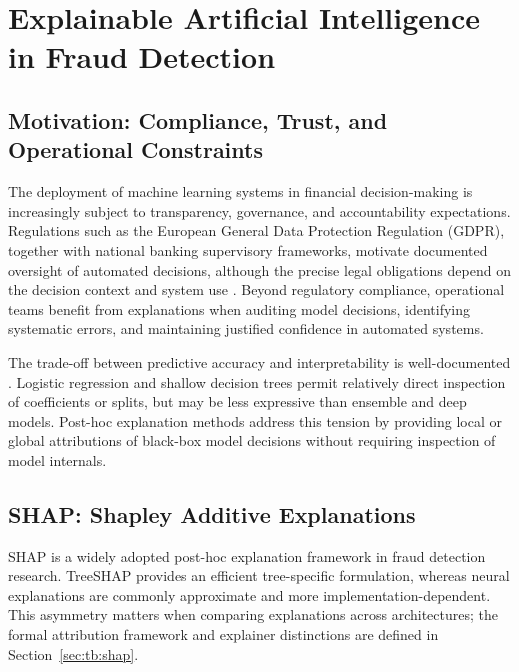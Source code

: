 \section{Explainable Artificial Intelligence in Fraud Detection}
\label{subsec:XAI}

\subsection{Motivation: Compliance, Trust, and Operational Constraints}
\label{subsec:sota-xai-motivation}

The deployment of machine learning systems in financial decision-making is increasingly subject to transparency, governance, and accountability expectations. Regulations such as the European General Data Protection Regulation (GDPR), together with national banking supervisory frameworks, motivate documented oversight of automated decisions, although the precise legal obligations depend on the decision context and system use \cite{nesvijevskaia2021accuracy}. Beyond regulatory compliance, operational teams benefit from explanations when auditing model decisions, identifying systematic errors, and maintaining justified confidence in automated systems.

The trade-off between predictive accuracy and interpretability is well-documented \cite{molnar2022interpretable}. Logistic regression and shallow decision trees permit relatively direct inspection of coefficients or splits, but may be less expressive than ensemble and deep models. Post-hoc explanation methods address this tension by providing local or global attributions of black-box model decisions without requiring inspection of model internals.

\subsection{SHAP: Shapley Additive Explanations}
\label{subsec:sota-shap}

SHAP \cite{lundberg2017unified} is a widely adopted post-hoc explanation framework in fraud detection research. TreeSHAP \cite{lundberg2020local} provides an efficient tree-specific formulation, whereas neural explanations are commonly approximate and more implementation-dependent. This asymmetry matters when comparing explanations across architectures; the formal attribution framework and explainer distinctions are defined in Section~\ref{sec:tb:shap}.

